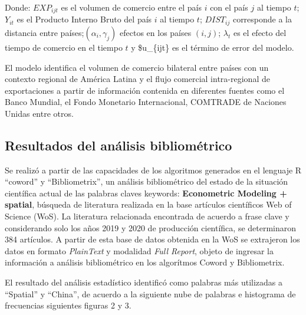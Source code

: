 \documentclass[
  spanish,
  twocolumn]{article}
\begin{document}
Donde: \(EXP_{ijt}\) es el volumen de comercio entre el país \(i\) con
el país \(j\) al tiempo \(t\); \(Y_{it}\) es el Producto Interno Bruto
del país \(i\) al tiempo \(t\); \(DIST_{ij}\) corresponde a la distancia
entre países;\((\alpha_i,\gamma_j)\) efectos en los países \((i,j)\);
\(\lambda_t\) es el efecto del tiempo de comercio en el tiempo \(t\) y
\$u\_\{ijt\} es el término de error del modelo.

El modelo identifica el volumen de comercio bilateral entre países con
un contexto regional de América Latina y el flujo comercial
intra-regional de exportaciones
\autocite{vallina-hernandez_gravity_2020} a partir de información
contenida en diferentes fuentes como el Banco Mundial, el Fondo
Monetario Internacional, COMTRADE de Naciones Unidas entre otros.

\hypertarget{resultados-del-anuxe1lisis-bibliomuxe9trico}{%
\subsection{Resultados del análisis
bibliométrico}\label{resultados-del-anuxe1lisis-bibliomuxe9trico}}

Se realizó a partir de las capacidades de los algoritmos generados en el
lenguaje R ``coword'' y ``Bibliometrix'', un análisis bibliométrico del
estado de la situación científica actual de las palabras claves
keywords: \textbf{Econometric Modeling + spatial}, búsqueda de
literatura realizada en la base artículos científicos Web of Science
(WoS). La literatura relacionada encontrada de acuerdo a frase clave y
considerando solo los años 2019 y 2020 de producción científica, se
determinaron 384 artículos. A partir de esta base de datos obtenida en
la WoS se extrajeron los datos en formato \emph{PlainText} y modalidad
\emph{Full Report}, objeto de ingresar la información a análisis
bibliométrico en los algorítmos Coword y Bibliometrix.

El resultado del análisis estadístico identificó como palabras más
utilizadas a ``Spatial'' y ``China'', de acuerdo a la siguiente nube de
palabras e histograma de frecuencias siguientes figuras 2 y 3.

\printbibliography
\end{document}
